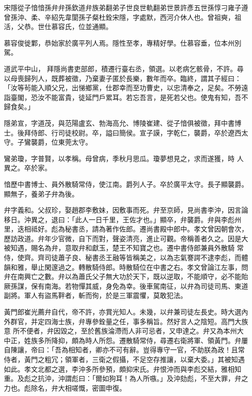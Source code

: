 
\begin{pinyinscope}

 宋隱從子愔愔孫弁弁孫欽道弁族弟翻弟子世良世軌翻弟世景許彥五世孫惇刁雍子遵曾孫沖、柔、辛紹先韋閬孫子粲杜銓宋隱，字處默，西河介休人也。曾祖奭，祖活，父恭。世仕慕容氏，位並通顯。



 慕容俊徙鄴，恭始家於廣平列人焉。隱性至孝，專精好學。仕慕容垂，位本州別駕。



 道武平中山，
 拜隱尚書吏部郎，積遷行臺右丞，領選。以老病乞骸骨，不許。尋以母喪歸列人，既葬被徵，乃棄妻子匿於長樂，數年而卒。臨終，謂其子經曰：「汝等茍能入順父兄，出悌鄉黨，仕郡幸而至功曹史，以忠清奉之，足矣。不勞遠詣臺閣，恐汝不能富貴，徒延門戶累耳。若忘吾言，是死若父也。使鬼有知，吾不歸食矣。」



 隱弟宣，字道茂，與范陽盧玄、勃海高允、博陵崔建、從子愔俱被徵，拜中書博士。後拜侍郎、行司徒校尉。卒，謚曰簡侯。宣子謨，字乾仁，襲爵，卒於遼西太守。子鸞襲爵，位東莞太守。



 鸞弟瓊，字普賢，以孝稱。母曾病，季秋月思瓜。瓊夢想見之，求而遂獲，時
 人異之。卒於家。



 愔歷中書博士、員外散騎常侍，使江南。爵列人子。卒於廣平太守。長子顯襲爵。顯無子，養弟子弁為後。



 弁字義和。父叔珍，娶趙郡李敷妹，因敷事而死。弁至京師，見尚書李沖，因言論移日。沖異之，退曰：「此人一日千里，王佐才也。」顯卒，弁襲爵。弁與李彪州里，迭相祗好。彪為秘書丞，請為著作佐郎。遷尚書殿中郎中。孝文曾因朝會次，歷訪政道。弁年少官微，自下而對，聲姿清亮，進止可觀。帝稱善者久之。因是大被知遇，賜名為弁，意取弁和獻玉，楚王不知寶之也。遷中書侍郎兼員外散騎
 常侍，使齊。齊司徒蕭子良、秘書丞王融等皆稱美之，以為志氣謇諤不逮李彪，而體韻和雅，舉止閑邃過之。轉散騎侍郎。時散騎位在中書之右。孝文曾論江左事，問弁在南興亡之數。弁以為蕭氏父子無大功於天下，既以逆取，不能順守，必不能貽厥孫謀，保有南海。若物憚其威，身免為幸。後車駕南征，以弁為司徒司馬、東道副將。軍人有盜馬靽者，斬而徇，於是三軍震懼，莫敢犯法。



 黃門郎崔光薦弁自代，帝不許，亦賞光知人。未幾，以弁兼司徒左長史。時大選內外群官，并定四海士族，弁專參銓量之任，事多稱旨。然好言人之陰短。高門大族意
 所不便者，弁因毀之，至於舊族淪滯而人非可忌者，又申達之。弁又為本州大中正，姓族多所降抑，頗為時人所怨。遷散騎常侍，尋遷右衛將軍、領黃門。弁屢自陳讓，帝曰：「吾為相知者，卿亦不可有辭。豈得專守一官，不助朕為政！且常侍者，黃門之粗冗；領軍者，三衛之假攝，不足空存推讓，以棄大委。」其被知遇如此。孝文北都之選，李沖多所參預，頗抑宋氏。弁恨沖而與李彪交結，雅相知重。及彪之抗沖，沖謂彪曰：「爾如狗耳！為人所嗾。」及沖劾彪，不至大罪，弁之力也。彪除名，弁大相嗟慨，密圖申復。




\end{pinyinscope}
